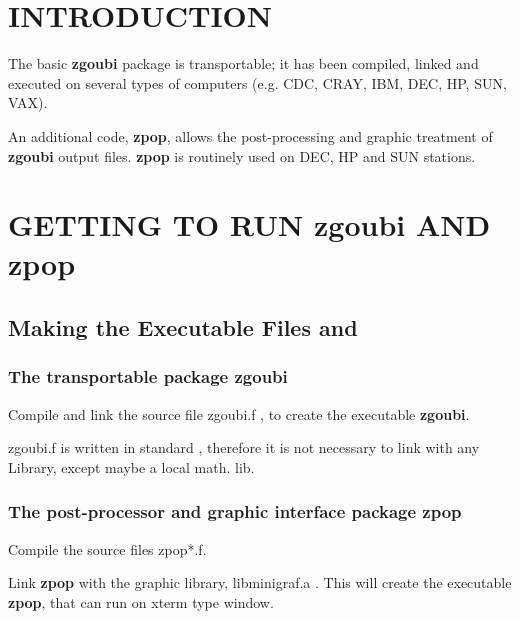  \clearemptydoublepage

    
\section*{INTRODUCTION} %

The basic \textbf{zgoubi} \FORTRAN package is transportable; it has been
compiled, linked and executed on several types of computers (e.g. 
CDC, CRAY, IBM, DEC, HP, SUN, 
VAX).  
\bigskip

\noindent An additional \FORTRAN code, \textbf{zpop},
allows the post-processing and graphic treatment of \textbf{zgoubi} output 
files. \textbf{zpop} is routinely used on DEC, HP and SUN stations.
\bigskip

\section{GETTING TO RUN zgoubi AND zpop} %

\subsection{Making the Executable Files \zgoubi and \zpop}

\subsubsection{The transportable package zgoubi}

Compile and link the \FORTRAN source file zgoubi.f , to create the 
executable \textbf{zgoubi}.
\bigskip

\noindent zgoubi.f is  written in standard 
\FORTRAN, therefore it is not necessary to link with any Library, 
except maybe a local math. lib.  

\subsubsection{The post-processor and graphic interface package zpop} 

Compile  the  \FORTRAN source files zpop*.f. 
\bigskip


\noindent Link \textbf{zpop} with the graphic library, libminigraf.a 
\cite{HAMEL}. This will create the executable \textbf{zpop}, that can run on 
xterm type window. 
\bigskip

